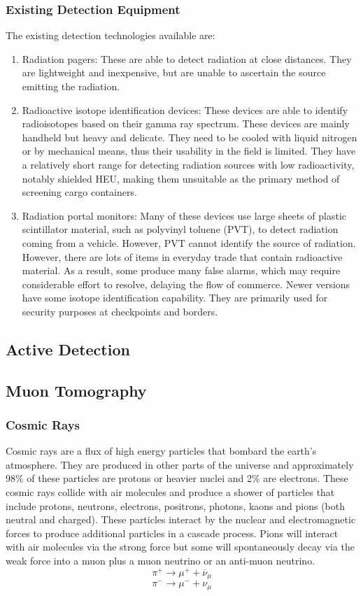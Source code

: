 \documentclass[twoside,titlepage,11pt,twocolumn,a4paper]{article}
\begin{document}
\subsubsection{Existing Detection Equipment}
The existing detection technologies available are:
\begin{enumerate}
\item Radiation pagers: These are able to detect radiation at close
  distances. They are lightweight and inexpensive, but are unable to
  ascertain the source emitting the radiation. \citep{medalia2007}
\item Radioactive isotope identification devices: These devices are
  able to identify radioisotopes based on their gamma ray
  spectrum. These devices are mainly handheld but heavy and
  delicate. They need to be cooled with liquid nitrogen or by
  mechanical means, thus their usability in the field is limited. They
  have a relatively short range for detecting radiation sources with
  low radioactivity, notably shielded HEU, making them unsuitable as
  the primary method of screening cargo
  containers. \citep{medalia2007}
\item Radiation portal monitors: Many of these devices use large
  sheets of plastic scintillator material, such as polyvinyl toluene
  (PVT), to detect radiation coming from a vehicle.  However, PVT
  cannot identify the source of radiation. However, there are lots of
  items in everyday trade that contain radioactive material. As a
  result, some produce many false alarms, which may require
  considerable effort to resolve, delaying the flow of commerce.
  Newer versions have some isotope identification
  capability. \citep{medalia2007} They are primarily used for security
  purposes at checkpoints and borders. \citep{nuclearMatDet}
\end{enumerate}

\subsection{Active Detection}

\subsection{Muon Tomography}
\subsubsection{Cosmic Rays}
Cosmic rays are a flux of high energy particles that bombard the
earth’s atmosphere. They are produced in other parts of the universe
and approximately 98\% of these particles are protons or heavier
nuclei and 2\% are electrons. These cosmic rays collide with air
molecules and produce a shower of particles that include protons,
neutrons, electrons, positrons, photons, kaons and pions (both neutral
and charged). These particles interact by the nuclear and
electromagnetic forces to produce additional particles in a cascade
process. Pions will interact with air molecules via the strong force
but some will spontaneously decay via the weak force into a muon plus
a muon neutrino or an anti-muon neutrino. \citep{muonManual2005}
\[ \pi^+ \rightarrow \mu^+ + \overline{\nu}_\mu \]
\[ \pi^- \rightarrow \mu^- + \nu_\mu \]
\end{document}
